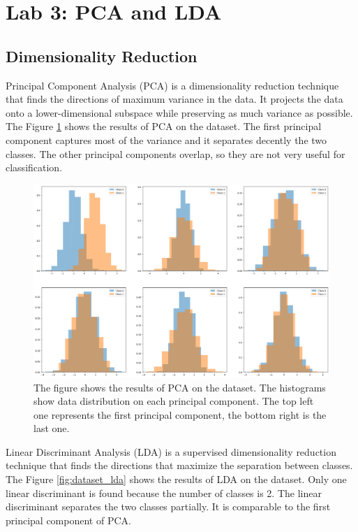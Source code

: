 \documentclass{article}
\begin{document}
\section{Lab 3: PCA and LDA}
\label{sec:pca_lda}

\subsection{Dimensionality Reduction}
Principal Component Analysis (PCA) is a dimensionality reduction technique that finds the directions of maximum variance in the data. It projects the data onto a lower-dimensional subspace while preserving as much variance as possible. The Figure \ref{fig:dataset_pca} shows the results of PCA on the dataset. The first principal component captures most of the variance and it separates decently the two classes. The other principal components overlap, so they are not very useful for classification.

\begin{figure}[ht]
    \centering
    \includegraphics[width=\textwidth]{images/dataset_pca.png}
    \caption{The figure shows the results of PCA on the dataset. The histograms show data distribution on each principal component. The top left one represents the first principal component, the bottom right is the last one. }
    \label{fig:dataset_pca}
\end{figure}

Linear Discriminant Analysis (LDA) is a supervised dimensionality reduction technique that finds the directions that maximize the separation between classes. The Figure \ref{fig:dataset_lda} shows the results of LDA on the dataset. Only one linear discriminant is found because the number of classes is 2. The linear discriminant separates the two classes partially. It is comparable to the first principal component of PCA.
\end{document}
